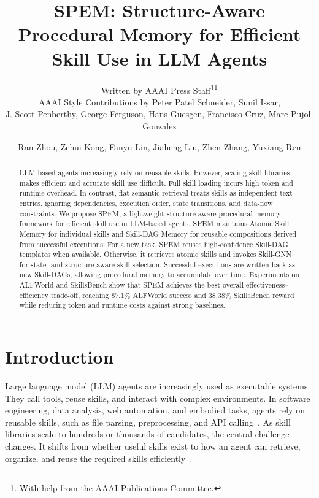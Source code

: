 \documentclass[letterpaper]{article} %
\title{SPEM: Structure-Aware Procedural Memory for Efficient Skill Use in LLM Agents}
\author{
    Written by AAAI Press Staff\textsuperscript{\rm 1}\thanks{With help from the AAAI Publications Committee.}\\
    AAAI Style Contributions by Peter Patel Schneider,
    Sunil Issar,\\
    J. Scott Penberthy,
    George Ferguson,
    Hans Guesgen,
    Francisco Cruz\equalcontrib\corresponding,
    Marc Pujol-Gonzalez\equalcontrib\corresponding
}
\author{
    Ran Zhou,
    Zehui Kong,
    Fanyu Lin,
    Jiaheng Liu,
    Zhen Zhang,
    Yuxiang Ren\corresponding
}
\newcommand{\model}{\textsc{SPEM}}
\begin{document}
\maketitle

\begin{abstract}
LLM-based agents increasingly rely on reusable skills. However, scaling skill libraries makes efficient and accurate skill use difficult. Full skill loading incurs high token and runtime overhead. In contrast, flat semantic retrieval treats skills as independent text entries, ignoring dependencies, execution order, state transitions, and data-flow constraints. We propose \model{}, a lightweight structure-aware procedural memory framework for efficient skill use in LLM-based agents. \model{} maintains Atomic Skill Memory for individual skills and Skill-DAG Memory for reusable compositions derived from successful executions. For a new task, \model{} reuses high-confidence Skill-DAG templates when available. Otherwise, it retrieves atomic skills and invokes Skill-GNN for state- and structure-aware skill selection. Successful executions are written back as new Skill-DAGs, allowing procedural memory to accumulate over time. Experiments on ALFWorld and SkillsBench show that \model{} achieves the best overall effectiveness--efficiency trade-off, reaching 87.1\% ALFWorld success and 38.38\% SkillsBench reward while reducing token and runtime costs against strong baselines.
\end{abstract}


\section{Introduction}

Large language model (LLM) agents are increasingly used as executable systems. They call tools, reuse skills, and interact with complex environments. In software engineering, data analysis, web automation, and embodied tasks, agents rely on reusable skills, such as file parsing, preprocessing, and API calling~\cite{schick2023toolformer,mialon2023augmented,yao2023react}. As skill libraries scale to hundreds or thousands of candidates, the central challenge changes. It shifts from whether useful skills exist to how an agent can retrieve, organize, and reuse the required skills efficiently~\cite{patil2023gorilla,qin2024toolllm,shi2025toolsavvy}.
\end{document}
